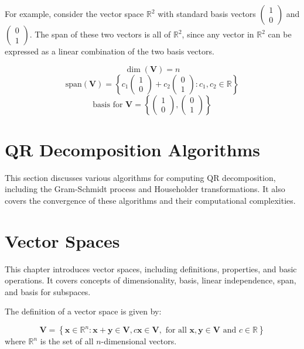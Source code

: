 \documentclass{report}%
\begin{document}
For example, consider the vector space $\mathbb{R}^2$ with standard basis vectors $\begin{pmatrix} 1 \\ 0 \end{pmatrix}$ and $\begin{pmatrix} 0 \\ 1 \end{pmatrix}$. The span of these two vectors is all of $\mathbb{R}^2$, since any vector in $\mathbb{R}^2$ can be expressed as a linear combination of the two basis vectors.

$$
\dim(\mathbf{V}) = n
$$
$$
\text{span}(\mathbf{V}) = \left\{ c_1\begin{pmatrix} 1 \\ 0 \end{pmatrix} + c_2\begin{pmatrix} 0 \\ 1 \end{pmatrix} : c_1, c_2 \in \mathbb{R} \right\}
$$
$$
\text{basis for }\mathbf{V} = \left\{ \begin{pmatrix} 1 \\ 0 \end{pmatrix}, \begin{pmatrix} 0 \\ 1 \end{pmatrix} \right\}
$$%
\section{QR Decomposition Algorithms}%
This section discusses various algorithms for computing QR decomposition, including the Gram-Schmidt process and Householder transformations. It also covers the convergence of these algorithms and their computational complexities.

%
\section*{Vector Spaces}

This chapter introduces vector spaces, including definitions, properties, and basic operations. It covers concepts of dimensionality, basis, linear independence, span, and basis for subspaces.

The definition of a vector space is given by:

$$
 \mathbf{V} = \left\{ \mathbf{x} \in \mathbb{R}^n : \mathbf{x} + \mathbf{y} \in \mathbf{V}, c\mathbf{x} \in \mathbf{V}, \text{ for all } \mathbf{x}, \mathbf{y} \in \mathbf{V} \text{ and } c \in \mathbb{R} \right\}
$$
where $\mathbb{R}^n$ is the set of all $n$-dimensional vectors.
\end{document}
